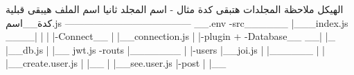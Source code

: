 الهيكل
ملاحظة المجلدات  هتبقى كدة مثال - اسم المجلد
ثانيا اسم الملف هيبقى قبلية كدة__اسم.js
---------------------------------------
__.env
-src______
          |___index.js  
      ____|
     |
     |
     |-Connect__
     |		      |__connection.js      
     |
     |-plugin + -Database__
   __|   	    |_           |__db.js
  |             |__ jwt.js  
 -routs 	      |_______
	 |   |-users          |__joi.js
   |          |______
   |          |      |__create.user.js
   |          |__
   |          |__see.user.js    
   |-post    
      |
      |__
          
   
